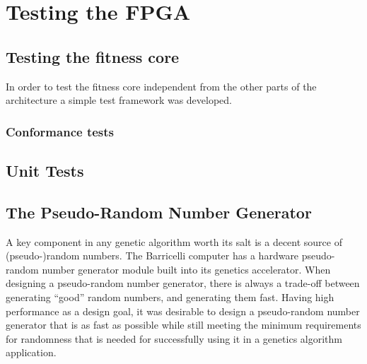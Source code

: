 \section{Testing the FPGA}

\subsection{Testing the fitness core}
In order to test the fitness core independent from the other parts of the architecture a simple test framework was developed. 


\subsubsection{Conformance tests}























\subsection{Unit Tests}

\subsection{The Pseudo-Random Number Generator}

A key component in any genetic algorithm worth its salt is a decent source of (pseudo-)random numbers.
The Barricelli computer has a hardware pseudo-random number generator module built into its genetics accelerator.
When designing a pseudo-random number generator, there is always a trade-off between generating ``good'' random numbers, and generating them fast.
Having high performance as a design goal\cn, it was desirable to design a pseudo-random number generator that is as fast as possible while still meeting the minimum requirements for randomness that is needed for successfully using it in a genetics algorithm application.

